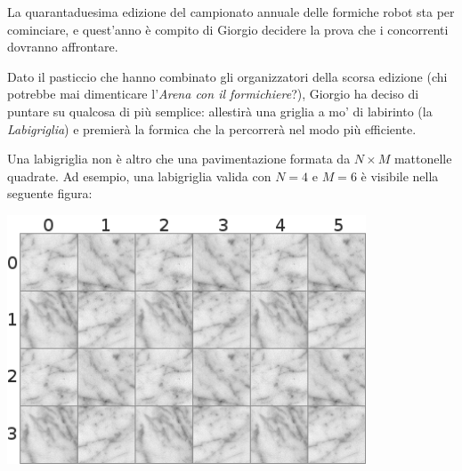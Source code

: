 \usepackage{xcolor}
\usepackage{afterpage}
\usepackage{pifont,mdframed}
\usepackage[bottom]{footmisc}

\makeatletter
\gdef\this@inputfilename{input.txt}
\gdef\this@outputfilename{output.txt}
\makeatother

\newcommand{\inputfile}{\texttt{input.txt}}
\newcommand{\outputfile}{\texttt{output.txt}}

\newenvironment{warning}
  {\par\begin{mdframed}[linewidth=2pt,linecolor=gray]%
    \begin{list}{}{\leftmargin=1cm
                   \labelwidth=\leftmargin}\item[\Large\ding{43}]}
  {\end{list}\end{mdframed}\par}

La quarantaduesima edizione del campionato annuale delle formiche robot sta per cominciare, e quest'anno è compito di Giorgio decidere la prova che i concorrenti dovranno affrontare.

Dato il pasticcio che hanno combinato gli organizzatori della scorsa edizione (chi potrebbe mai dimenticare l'\emph{Arena con il formichiere}?), Giorgio ha deciso di puntare su qualcosa di più semplice: allestirà una griglia a mo' di labirinto (la \emph{Labigriglia}) e premierà la formica che la percorrerà nel modo più efficiente.

Una labigriglia non è altro che una pavimentazione formata da $N \times M$ mattonelle quadrate. Ad esempio, una labigriglia valida con $N=4$ e $M=6$ è visibile nella seguente figura:

\begin{center}
  \includegraphics[width=0.8\textwidth]{floor.png}
\end{center}


